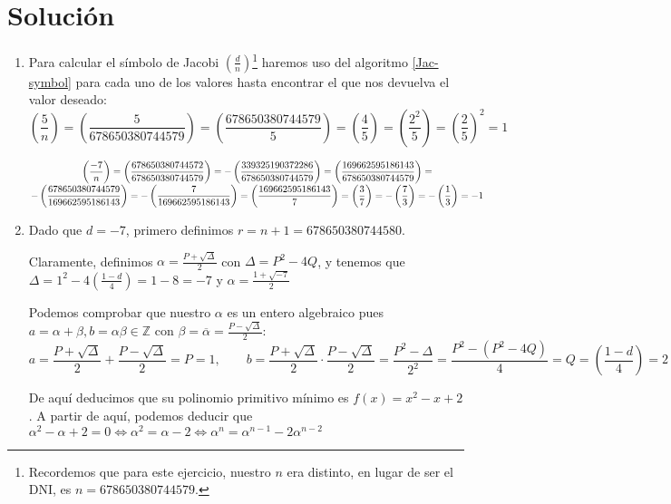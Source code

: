 \section*{Solución}
	\begin{enumerate}
		\item Para calcular el símbolo de Jacobi $\displaystyle \left(\frac{d}{n}\right)$\footnote{Recordemos que
		para este ejercicio, nuestro $n$ era distinto, en lugar de ser el DNI, es $n = 678650380744579$.} haremos
		uso del algoritmo \ref{Jac-symbol} para cada uno de los valores hasta encontrar el que nos devuelva el
		valor deseado:
		$$\left(\frac{5}{n}\right) = \left(\frac{5}{678650380744579} \right)= \left(\frac{678650380744579}{5}\right)
		= \left(\frac{4}{5}\right) = \left(\frac{2^2}{5}\right) = \left(\frac{2}{5}\right)^2 = 1$$
		
		$$\displaystyle \left(\frac{-7}{n}\right) = \left(\frac{678650380744572}{678650380744579} \right)=
		-\left(\frac{339325190372286}{678650380744579} \right) = \left(\frac{169662595186143}{678650380744579} \right)
		= \atop \displaystyle -\left(\frac{678650380744579}{169662595186143} \right) = -\left(\frac{7}
		{169662595186143} \right) = \left(\frac{169662595186143}{7} \right) = \left(\frac{3}{7} \right) =
		-\left(\frac{7}{3} \right) = -\left(\frac{1}{3} \right) = -1$$
		
		\item Dado que $d = -7$, primero definimos $r = n+1 = 678650380744580$.
		
		Claramente, definimos $\displaystyle \alpha = \frac{P + \sqrt{\Delta}}{2}$ con $\Delta = P^2 - 4Q$,
		y tenemos que $\displaystyle \Delta = 1^2 - 4\left(\frac{1-d}{4}\right) = 1-8 = -7$ y $\displaystyle
		\alpha = \frac{1 + \sqrt{-7}}{2}$
		
		Podemos comprobar que nuestro $\alpha$ es un entero algebraico pues $a = \alpha + \beta, b = \alpha
		\beta \in \mathbb{Z}$ con $\displaystyle \beta = \overline{\alpha} = \frac{P - \sqrt{\Delta}}{2}$:
		$$\displaystyle a = \frac{P + \sqrt{\Delta}}{2} + \frac{P - \sqrt{\Delta}}{2} = P = 1, \qquad
		b = \frac{P + \sqrt{\Delta}}{2} \cdot \frac{P - \sqrt{\Delta}}{2} = \frac{P^2-\Delta}{2^2} =
		\frac{P^2-(P^2-4Q)}{4} = Q = \left(\frac{1-d}{4}\right) = 2$$
		
		De aquí deducimos que su polinomio primitivo mínimo es $f(x) = x^2 -x +2$. A partir de aquí, podemos
		deducir que $\alpha^2 -\alpha +2 = 0 \Leftrightarrow \alpha^2  = \alpha -2 \Leftrightarrow \alpha^n =
		\alpha^{n-1} - 2\alpha^{n-2}$
		

\end{enumerate}
